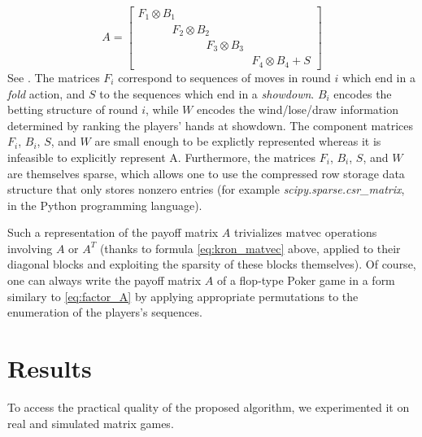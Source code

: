 \documentclass{article} %
\begin{document}
\begin{equation}
  A = \begin{bmatrix}F_1 \otimes B_1\hspace{10em}\\\hspace{3em}F_2 \otimes B_2\hspace{7em}\\\hspace{6em}F_3 \otimes B_3\hspace{4em}\\\hspace{10em}F_4 \otimes B_4 + S \end{bmatrix}
\label{eq:factor_A}
\end{equation}
See \cite{hoda2010smoothing}. The matrices $F_i$ correspond to sequences of moves in round $i$ which end in a \textit{fold} action, and $S$ to the sequences which end in a \textit{showdown}. $B_i$ encodes the betting structure of round $i$, while $W$ encodes the wind/lose/draw information determined by ranking the players' hands at showdown. The component matrices $F_i$, $B_i$, $S$, and $W$ are small enough to be explictly represented whereas it is infeasible to explicitly represent A. Furthermore, the matrices $F_i$, $B_i$,
$S$, and $W$ are themselves sparse, which allows one to use the compressed row storage data structure that only stores nonzero entries (for example \textit{scipy.sparse.csr\_matrix}, in the Python programming language).

Such a representation of the payoff matrix $A$ trivializes matvec operations involving $A$ or $A^T$ (thanks to formula \eqref{eq:kron_matvec} above, applied to their diagonal blocks and exploiting the sparsity of these blocks themselves). Of course, one can always write the payoff matrix $A$ of a flop-type Poker game in a form similary to \eqref{eq:factor_A} by applying appropriate permutations to the enumeration of the players's sequences.

\section{Results}
\label{sec:results}
To access the practical quality of the proposed algorithm, we
experimented it on real and simulated matrix games.
\end{document}
